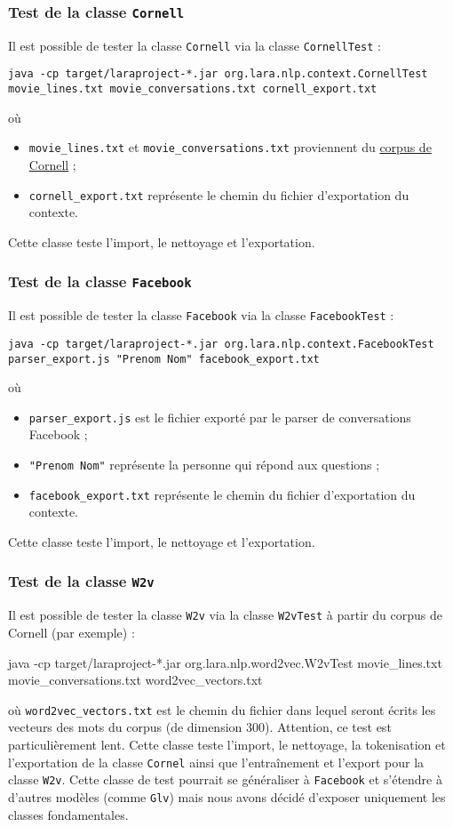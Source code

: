 \documentclass[10pt,a4paper]{article}
\begin{document}
\subsubsection{Test de la classe \texttt{Cornell}}
Il est possible de tester la classe \texttt{Cornell} via la classe \texttt{CornellTest} :
\begin{center}
\texttt{java -cp target/laraproject-*.jar org.lara.nlp.context.CornellTest movie\_lines.txt movie\_conversations.txt cornell\_export.txt}
\end{center}
où
\begin{itemize}
\item \texttt{movie\_lines.txt} et \texttt{movie\_conversations.txt} proviennent du \href{https://www.cs.cornell.edu/~cristian/Cornell_Movie-Dialogs_Corpus.html}{corpus de Cornell} ;
\item \texttt{cornell\_export.txt} représente le chemin du fichier d'exportation du contexte.
\end{itemize}
Cette classe teste l'import, le nettoyage et l'exportation.
\subsubsection{Test de la classe \texttt{Facebook}}
Il est possible de tester la classe \texttt{Facebook} via la classe \texttt{FacebookTest} :
\begin{center}
\texttt{java -cp target/laraproject-*.jar org.lara.nlp.context.FacebookTest parser\_export.js "Prenom Nom" facebook\_export.txt}
\end{center}
où
\begin{itemize}
\item \texttt{parser\_export.js} est le fichier exporté par le parser de conversations Facebook ;
\item \texttt{"Prenom Nom"} représente la personne qui répond aux questions ;
\item \texttt{facebook\_export.txt} représente le chemin du fichier d'exportation du contexte.
\end{itemize}
Cette classe teste l'import, le nettoyage et l'exportation.
\subsubsection{Test de la classe \texttt{W2v}}
Il est possible de tester la classe \texttt{W2v} via la classe \texttt{W2vTest} à partir du corpus de Cornell (par exemple) :
\begin{center}
java -cp target/laraproject-*.jar org.lara.nlp.word2vec.W2vTest movie\_lines.txt movie\_conversations.txt word2vec\_vectors.txt
\end{center}
où \texttt{word2vec\_vectors.txt} est le chemin du fichier dans lequel seront écrits les vecteurs des mots du corpus (de dimension 300). Attention, ce test est particulièrement lent. Cette classe teste l'import, le nettoyage, la tokenisation et l'exportation de la classe \texttt{Cornel} ainsi que l'entraînement et l'export pour la classe \texttt{W2v}. Cette classe de test pourrait se généraliser à \texttt{Facebook} et s'étendre à d'autres modèles (comme \texttt{Glv}) mais nous avons décidé d'exposer uniquement les classes fondamentales.
\end{document}
